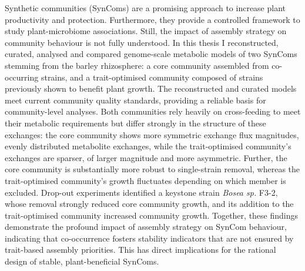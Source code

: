 \begin{center} 
    \huge {}
\end{center}

Synthetic communities (SynComs) are a promising approach to increase plant productivity and protection. Furthermore, they provide a controlled framework to study plant-microbiome associations. Still, the impact of assembly strategy on community behaviour is not fully understood. In this thesis I reconstructed, curated, analysed and compared genome-scale metabolic models of two SynComs stemming from the barley rhizosphere: a core community assembled from co-occurring strains, and a trait-optimised community composed of strains previously shown to benefit plant growth. The reconstructed and curated models meet current community quality standards, providing a reliable basis for community-level analyses. Both communities rely heavily on cross-feeding to meet their metabolic requirements but differ strongly in the structure of these exchanges: the core community shows more symmetric exchange flux magnitudes, evenly distributed metabolite exchanges, while the trait-optimised community's exchanges are sparser, of larger magnitude and more asymmetric. Further, the core community is substantially more robust to single-strain removal, whereas the trait-optimised community's growth fluctuates depending on which member is excluded. Drop-out experiments identified a keystone strain \textit{Bosea sp.} F3-2, whose removal strongly reduced core community growth, and its addition to the trait-optimised community increased community growth. Together, these findings demonstrate the profound impact of assembly strategy on SynCom behaviour, indicating that co-occurrence fosters stability indicators that are not ensured by trait-based assembly priorities. This has direct implications for the rational design of stable, plant-beneficial SynComs.